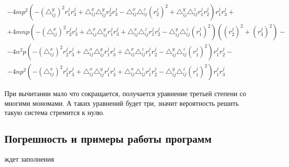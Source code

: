$$\begin{gathered}
	- 4 m p^2 \left( - \left( \triangle_{ij}^y\right)^2 r_1^j r_3^j +  \triangle_{ij}^x \triangle_{ij}^y r_2^j r_3^j -  \triangle_{ij}^x  \triangle_{ij}^z (r_2^j)^2 +  \triangle_{ij}^y  \triangle_{ij}^z r_1^j r_2^j \right) r_1^j r_3^j + \\
	+ 4 m n p \left( - \left(\triangle_{ij}^x\right)^2 r_2^j r_3^j +  \triangle_{ij}^x \triangle_{ij}^y r_1^j r_3^j +  \triangle_{ij}^x  \triangle_{ij}^z r_1^j r_2^j -  \triangle_{ij}^y  \triangle_{ij}^z (r_1^j)^2 \right)     \left((r_2^j)^2 + (r_3^j)^2\right) - \\
	- 4 n^2 p \left( - \left(\triangle_{ij}^x\right)^2 r_2^j r_3^j +  \triangle_{ij}^x \triangle_{ij}^y r_1^j r_3^j +  \triangle_{ij}^x  \triangle_{ij}^z r_1^j r_2^j -  \triangle_{ij}^y  \triangle_{ij}^z (r_1^j)^2 \right) r_1^j r_2^j - \\
	- 4 n p^2 \left( - \left(\triangle_{ij}^x\right)^2 r_2^j r_3^j +  \triangle_{ij}^x \triangle_{ij}^y r_1^j r_3^j +  \triangle_{ij}^x  \triangle_{ij}^z r_1^j r_2^j -  \triangle_{ij}^y  \triangle_{ij}^z (r_1^j)^2 \right) r_1^j r_3^j
\end{gathered}$$

При вычитании мало что сокращается, получается уравнение третьей степени со многими мономами. А таких уравнений будет три, значит вероятность решить такую система стремится к нулю.\\



\subsection{Погрешность и примеры работы программ}\label{math3:error}

ждет заполнения

\newpage


